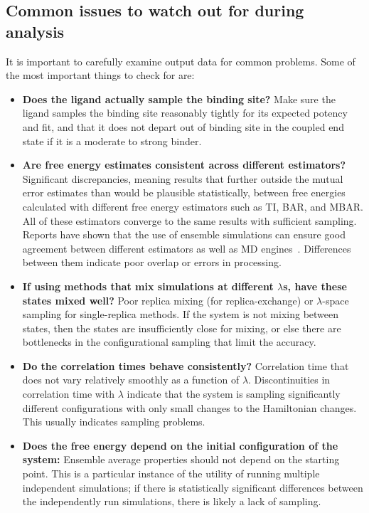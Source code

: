 \subsection{Common issues to watch out for during analysis}

It is important to carefully examine output data for common problems. Some of the most important things to check for are:
\begin{itemize}
\item \textbf{Does the ligand actually sample the binding site?} Make sure the ligand samples the binding site reasonably tightly for its expected potency and fit, and that it does not depart out of binding site in the coupled end state if it is a moderate to strong binder. 
\item \textbf{Are free energy estimates consistent across different estimators?} Significant discrepancies, meaning results that further outside the mutual error estimates than would be plausible statistically, between free energies calculated with different free energy estimators such as TI, BAR, and MBAR. All of these estimators converge to the same results with sufficient sampling. Reports have shown that the use of ensemble simulations can ensure good agreement between different estimators as well as MD engines~\cite{wade2022}. Differences between them indicate poor overlap or errors in processing.
\item \textbf{If using methods that mix simulations at different $\lambda$s, have these states mixed well?} Poor replica mixing (for replica-exchange) or $\lambda$-space sampling for single-replica methods. If the system is not mixing between states, then the states are insufficiently close for mixing, or else there are bottlenecks in the configurational sampling that limit the accuracy.
\item \textbf{Do the correlation times behave consistently?} Correlation time that does not vary relatively smoothly as a function of $\lambda$. Discontinuities in correlation time with $\lambda$ indicate that the system is sampling significantly different configurations with only small changes to the Hamiltonian changes. This usually indicates sampling problems.
\item \textbf{Does the free energy depend on the initial configuration of the system:} Ensemble average properties should not depend on the starting point.  This is a particular instance of the utility of running multiple independent simulations; if there is statistically significant differences between the independently run simulations, there is likely a lack of sampling. 

\end{itemize}
